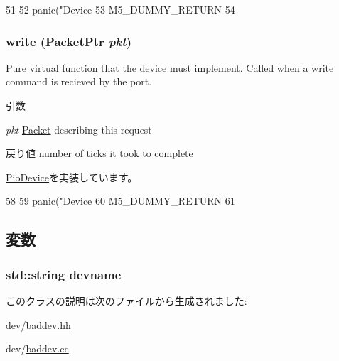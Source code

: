 \begin{DoxyCode}
51 {
52     panic("Device %
53     M5_DUMMY_RETURN
54 }
\end{DoxyCode}
\hypertarget{classBadDevice_a4cefab464e72b5dd42c003a0a4341802}{
\subsubsection[{write}]{ write ({\bf PacketPtr} {\em pkt})}}
\label{classBadDevice_a4cefab464e72b5dd42c003a0a4341802}
Pure virtual function that the device must implement. Called when a write command is recieved by the port. 
\begin{DoxyParams}{引数}
\item[{\em pkt}]\hyperlink{classPacket}{Packet} describing this request \end{DoxyParams}
\begin{DoxyReturn}{戻り値}
number of ticks it took to complete 
\end{DoxyReturn}


\hyperlink{classPioDevice_afe8371668d023bb2516b286e5e399b6f}{PioDevice}を実装しています。


\begin{DoxyCode}
58 {
59     panic("Device %
60     M5_DUMMY_RETURN
61 }
\end{DoxyCode}


\subsection{変数}
\hypertarget{classBadDevice_aa18b4566b08001962567d1424ad61b8c}{
\subsubsection[{devname}]{\setlength{\rightskip}{0pt plus 5cm}std::string {\bf devname}}}
\label{classBadDevice_aa18b4566b08001962567d1424ad61b8c}


このクラスの説明は次のファイルから生成されました:\begin{DoxyCompactItemize}
\item 
dev/\hyperlink{baddev_8hh}{baddev.hh}\item 
dev/\hyperlink{baddev_8cc}{baddev.cc}\end{DoxyCompactItemize}

